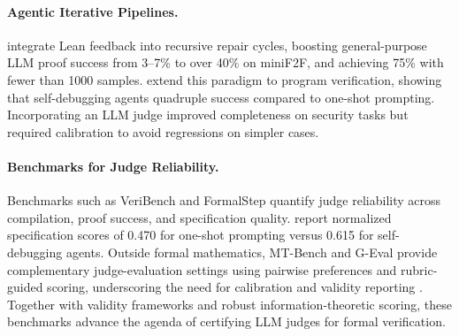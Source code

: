 \documentclass{article}
\begin{document}
\paragraph{Agentic Iterative Pipelines.}
\citet{ospanov2023apollo} integrate Lean feedback into recursive repair cycles, boosting general-purpose LLM proof success from 3--7\% to over 40\% on miniF2F, and achieving 75\% with fewer than 1000 samples. \citet{miranda2026veribench} extend this paradigm to program verification, showing that self-debugging agents quadruple success compared to one-shot prompting.
Incorporating an LLM judge improved completeness on security tasks but required calibration to avoid regressions on simpler cases.

\paragraph{Benchmarks for Judge Reliability.}
Benchmarks such as VeriBench and FormalStep quantify judge reliability across compilation, proof success, and specification quality.
\citet{miranda2026veribench} report normalized specification scores of 0.470 for one-shot prompting versus 0.615 for self-debugging agents.
Outside formal mathematics, MT-Bench and G-Eval provide complementary judge-evaluation settings using pairwise preferences and rubric-guided scoring, underscoring the need for calibration and validity reporting \citep{Zheng2023MTBench,Liu2023GEval}.
Together with validity frameworks and robust information-theoretic scoring, these benchmarks advance the agenda of certifying LLM judges for formal verification.

\end{document}
